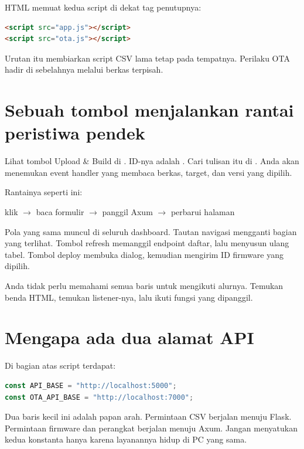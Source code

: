 HTML memuat kedua script di dekat tag penutupnya:

\begin{lstlisting}[language=HTML,numbers=none]
<script src="app.js"></script>
<script src="ota.js"></script>
\end{lstlisting}

Urutan itu membiarkan script CSV lama tetap pada tempatnya. Perilaku OTA hadir di sebelahnya melalui berkas terpisah.

\section{Sebuah tombol menjalankan rantai peristiwa pendek}

Lihat tombol Upload \& Build di . ID-nya adalah . Cari tulisan itu di . Anda akan menemukan event handler yang membaca berkas, target, dan versi yang dipilih.

Rantainya seperti ini:

\begin{center}
\ttfamily klik $\rightarrow$ baca formulir $\rightarrow$ panggil Axum $\rightarrow$ perbarui halaman
\end{center}

Pola yang sama muncul di seluruh dashboard. Tautan navigasi mengganti bagian yang terlihat. Tombol refresh memanggil endpoint daftar, lalu menyusun ulang tabel. Tombol deploy membuka dialog, kemudian mengirim ID firmware yang dipilih.

Anda tidak perlu memahami semua baris untuk mengikuti alurnya. Temukan benda HTML, temukan listener-nya, lalu ikuti fungsi yang dipanggil.

\section{Mengapa ada dua alamat API}

Di bagian atas script terdapat:

\begin{lstlisting}[language=JavaScript]
const API_BASE = "http://localhost:5000";
const OTA_API_BASE = "http://localhost:7000";
\end{lstlisting}

Dua baris kecil ini adalah papan arah. Permintaan CSV berjalan menuju Flask. Permintaan firmware dan perangkat berjalan menuju Axum. Jangan menyatukan kedua konstanta hanya karena layanannya hidup di PC yang sama.

